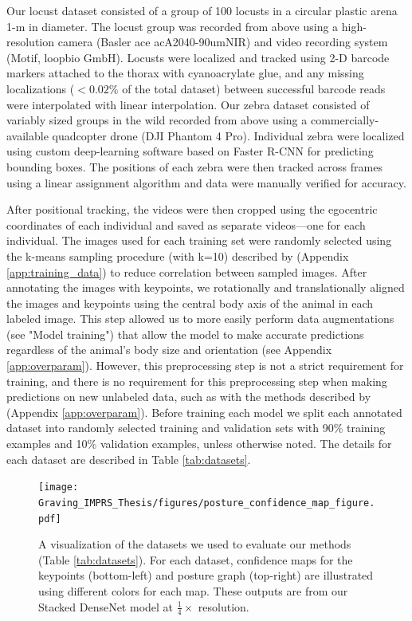 \documentclass[11pt,a4paper,twoside]{book}
\begin{document}
\begin{doublespace}
Our locust dataset consisted of a group of 100 locusts in a circular plastic arena 1-m in diameter. The locust group was recorded from above using a high-resolution camera (Basler ace acA2040-90umNIR) and video recording system (Motif, loopbio GmbH). Locusts were localized and tracked using 2-D barcode markers \citep{graving2017pinpoint} attached to the thorax with cyanoacrylate glue, and any missing localizations ($<0.02 \%$ of the total dataset) between successful barcode reads were interpolated with linear interpolation.  Our zebra dataset consisted of variably sized groups in the wild recorded from above using a commercially-available quadcopter drone (DJI Phantom 4 Pro). Individual zebra were localized using custom deep-learning software based on Faster R-CNN \citep{ren2015faster} for predicting bounding boxes. The positions of each zebra were then tracked across frames using a linear assignment algorithm \citep{munkres1957algorithms} and data were manually verified for accuracy.

After positional tracking, the videos were then cropped using the egocentric coordinates of each individual and saved as separate videos---one for each individual. The images used for each training set were randomly selected using the k-means sampling procedure (with k=10) described by \cite{pereira2019fast} (Appendix \ref{app:training_data}) to reduce correlation between sampled images. After annotating the images with keypoints, we rotationally and translationally aligned the images and keypoints using the central body axis of the animal in each labeled image. This step allowed us to more easily perform data augmentations (see "Model training") that allow the model to make accurate predictions regardless of the animal's body size and orientation (see Appendix \ref{app:overparam}). However, this preprocessing step is not a strict requirement for training, and there is no requirement for this preprocessing step when making predictions on new unlabeled data, such as with the methods described by \cite{pereira2019fast} (Appendix \ref{app:overparam}). Before training each model we split each annotated dataset into randomly selected training and validation sets with 90\% training examples and 10\% validation examples, unless otherwise noted. The details for each dataset are described in Table \ref{tab:datasets}.

\begin{figure}[!htb]

\begin{center}
\texttt{[image: Graving\_IMPRS\_Thesis/figures/posture\_confidence\_map\_figure.pdf]}
\end{center}
\caption{A visualization of the datasets we used to evaluate our methods (Table \ref{tab:datasets}). For each dataset, confidence maps for the keypoints (bottom-left) and posture graph (top-right) are illustrated using different colors for each map. These outputs are from our Stacked DenseNet model at $\frac{1}{4}\times$ resolution.}
\label{fig:posture_confidence_map_figure}



\end{figure}
\end{doublespace}
\end{document}
